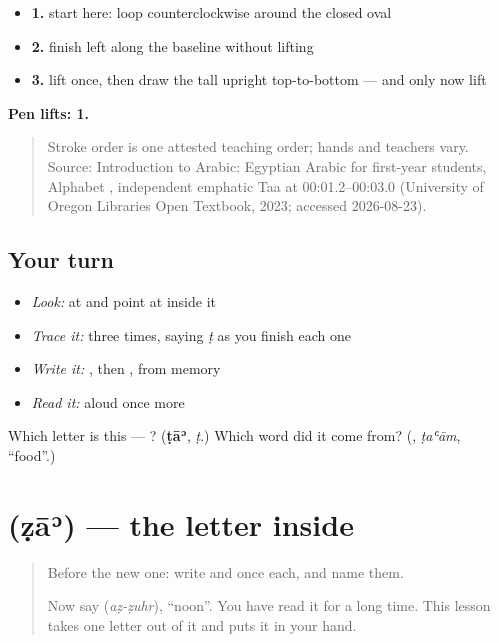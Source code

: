 \begin{itemize}
\raggedright
  \item \textbf{1.} start here: loop counterclockwise around the closed oval
  \item \textbf{2.} finish left along the baseline without lifting
  \item \textbf{3.} lift once, then draw the tall upright top-to-bottom — and only now lift
\end{itemize}

\textbf{Pen lifts: 1.}

\begin{quote}
Stroke order is one attested teaching order; hands and teachers vary. Source: Introduction to Arabic: Egyptian Arabic for first-year students, Alphabet  , independent emphatic Taa at 00:01.2–00:03.0 (University of Oregon Libraries Open Textbook, 2023; accessed 2026-08-23).
\end{quote}

\subsection*{Your turn}
\begin{itemize}
\raggedright
  \item \emph{Look:} at \textbf{} and point at  inside it
  \item \emph{Trace it:}  three times, saying \emph{ṭ} as you finish each one
  \item \emph{Write it:} , then , from memory
  \item \emph{Read it:} \textbf{} aloud once more
\end{itemize}

\begin{tcolorbox}[breakable,colback=teal!4,colframe=teal!35!black,title={Before you move on}]
Which letter is this — ? (\textbf{ṭāʾ}, \emph{ṭ}.) Which word did it come from? (\textbf{}, \emph{ṭaʿām}, \textquotedblleft{}food\textquotedblright{}.)
\end{tcolorbox}
\section[\texorpdfstring{\ar{ظ} (ẓāʾ)}{ظ (ẓāʾ)}]{ (ẓāʾ) — the letter inside }

\label{lesson:AR-W49-za-emphatic}



\begin{quote}
Before the new one: write  and  once each, and name them.

Now say \textbf{} (\emph{aẓ-ẓuhr}), \textquotedblleft{}noon\textquotedblright{}. You have read it for a long time. This lesson takes one letter out of it and puts it in your hand.
\end{quote}

